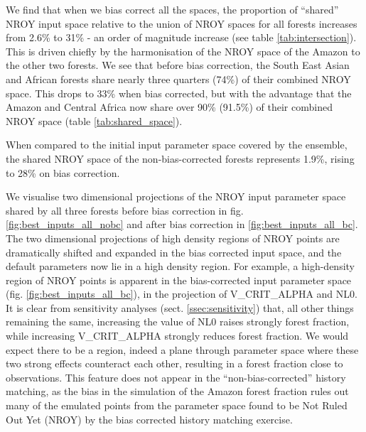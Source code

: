 \documentclass[gmd, manuscript]{copernicus}
\begin{document}
We find that when we bias correct all the spaces, the proportion of ``shared'' NROY input space relative to the union of NROY spaces for all forests increases from 2.6\% to 31\% - an order of magnitude increase (see table \ref{tab:intersection}). This is driven chiefly by the harmonisation of the NROY space of the Amazon to the other two forests. We see that before bias correction, the South East Asian and African forests share nearly three quarters (74\%) of their combined NROY space. This drops to 33\% when bias corrected, but with the advantage that the Amazon and Central Africa now share over 90\% (91.5\%) of their combined NROY space (table \ref{tab:shared_space}). 

When compared to the initial input parameter space covered by the ensemble, the shared NROY space of the non-bias-corrected forests represents 1.9\%, rising to 28\% on bias correction.

We visualise two dimensional projections of the NROY input parameter space shared by all three forests before bias correction in fig. \ref{fig:best_inputs_all_nobc} and after bias correction in \ref{fig:best_inputs_all_bc}. The two dimensional projections of high density regions of NROY points are dramatically shifted and expanded in the bias corrected input space, and the default parameters now lie in a high density region. For example, a high-density region of NROY points is apparent in the bias-corrected input parameter space (fig. \ref{fig:best_inputs_all_bc}), in the projection of V\_CRIT\_ALPHA and NL0. It is clear from  sensitivity analyses (sect. \ref{ssec:sensitivity}) that, all other things remaining the same, increasing the value of NL0 raises strongly forest fraction, while increasing V\_CRIT\_ALPHA strongly reduces forest fraction. We would expect there to be a region, indeed a plane through parameter space where these two strong effects counteract each other, resulting in a forest fraction close to observations. This feature does not appear in the “non-bias-corrected” history matching, as the bias in the simulation of the Amazon forest fraction rules out many of the emulated points from the parameter space found to be Not Ruled Out Yet (NROY) by the bias corrected history matching exercise. 
\end{document}
